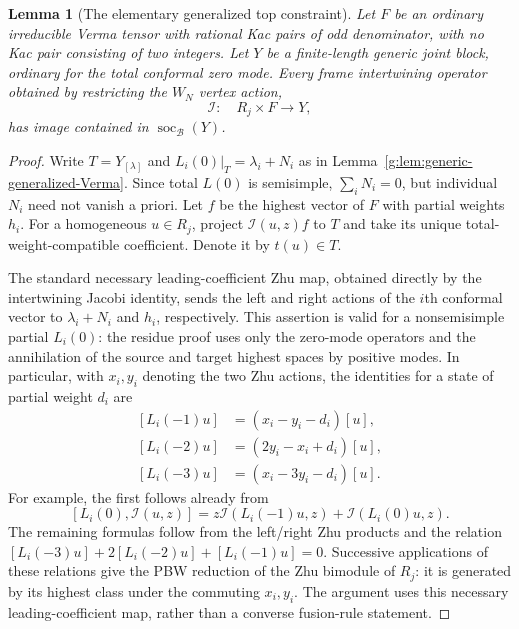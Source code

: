 \documentclass[11pt,a4paper]{article}
\numberwithin{equation}{section}
\newtheorem{lemma}[theorem]{Lemma}
\theoremstyle{definition}\newtheorem{definition}[theorem]{Definition}
\theoremstyle{remark}\newtheorem{remark}[theorem]{Remark}
\begin{document}
\begin{lemma}[The elementary generalized top constraint]
\label{g:lem:generic-top-constraint}
Let $F$ be an ordinary irreducible Verma tensor with rational Kac pairs
of odd denominator, with no Kac pair consisting of two integers.
Let $Y$ be a finite-length generic joint block, ordinary for the
\emph{total} conformal zero mode.  Every frame intertwining operator
obtained by restricting the $W_N$ vertex action,
\[
       \mathcal I:\quad R_j\times F\longrightarrow Y,
\]
has image contained in $\operatorname{soc}_{\mathcal B}(Y)$.
\end{lemma}
\begin{proof}
Write $T=Y_{[\lambda]}$ and $L_i(0)|_T=\lambda_i+N_i$ as in
Lemma~\ref{g:lem:generic-generalized-Verma}.  Since total $L(0)$ is
semisimple, $\sum_iN_i=0$, but individual $N_i$ need not vanish a
priori.  Let $f$ be the highest vector of $F$ with partial weights
$h_i$.  For a homogeneous $u\in R_j$, project
$\mathcal I(u,z)f$ to $T$ and take its unique total-weight-compatible
coefficient.  Denote it by $t(u)\in T$.

The standard necessary leading-coefficient Zhu map, obtained directly
by the intertwining Jacobi identity, sends the left and right actions of
the $i$th conformal vector to $\lambda_i+N_i$ and $h_i$, respectively.
This assertion is valid for a nonsemisimple partial $L_i(0)$: the
residue proof uses only the zero-mode operators and the annihilation
of the source and target highest spaces by positive modes.  In
particular, with $x_i,y_i$ denoting the two Zhu actions, the identities
for a state of partial weight $d_i$ are
\begin{equation}\label{g:eq:partial-zhu}
\begin{aligned}
 [L_i(-1)u]&=(x_i-y_i-d_i)[u],\\
 [L_i(-2)u]&=(2y_i-x_i+d_i)[u],\\
 [L_i(-3)u]&=(x_i-3y_i-d_i)[u].
\end{aligned}
\end{equation}
For example, the first follows already from
\[
 [L_i(0),\mathcal I(u,z)]
   =z\mathcal I(L_i(-1)u,z)+\mathcal I(L_i(0)u,z).
\]
The remaining formulas follow from the left/right Zhu products and
the relation $[L_i(-3)u]+2[L_i(-2)u]+[L_i(-1)u]=0$.
Successive applications of these relations give the PBW reduction
of the Zhu bimodule of $R_j$: it is generated by its highest class
under the commuting $x_i,y_i$.  The argument uses this necessary
leading-coefficient map, rather than a converse fusion-rule statement.


\end{proof}
\end{document}
